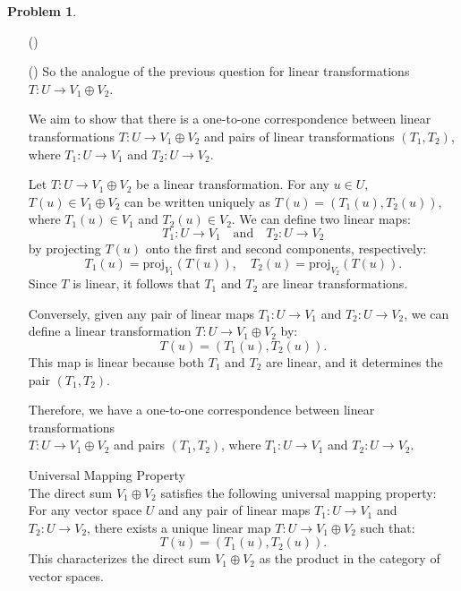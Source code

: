 \documentclass[12pt]{article}
\theoremstyle{definition}
\newtheorem{problem}{Problem}
\newcounter{subq}[problem]
\newenvironment{subproblem}
{\refstepcounter{subq} \begin{itemize} \item[(\alph{subq})]}
{\end{itemize} \medskip}
\begin{document}
\begin{problem}
\begin{subproblem}
\begin{solution}
        \end{solution}
    \end{subproblem}

    \begin{subproblem}
        So the analogue of the previous question for linear transformations $T:U \rightarrow V_1 \oplus V_2$.

        \begin{solution}
            We aim to show that there is a one-to-one correspondence between linear transformations \( T: U \to V_1 \oplus V_2 \) and pairs of linear transformations \( (T_1, T_2) \), where \( T_1: U \to V_1 \) and \( T_2: U \to V_2 \).

            Let \( T: U \to V_1 \oplus V_2 \) be a linear transformation. For any \( u \in U \), \( T(u) \in V_1 \oplus V_2 \) can be written uniquely as \( T(u) = (T_1(u), T_2(u)) \), where \( T_1(u) \in V_1 \) and \( T_2(u) \in V_2 \). We can define two linear maps:
            \[
            T_1: U \to V_1 \quad \text{and} \quad T_2: U \to V_2
            \]
            by projecting \( T(u) \) onto the first and second components, respectively:
            \[
            T_1(u) = \text{proj}_{V_1}(T(u)), \quad T_2(u) = \text{proj}_{V_2}(T(u)).
            \]
            Since \( T \) is linear, it follows that \( T_1 \) and \( T_2 \) are linear transformations.

            Conversely, given any pair of linear maps \( T_1: U \to V_1 \) and \( T_2: U \to V_2 \), we can define a linear transformation \( T: U \to V_1 \oplus V_2 \) by:
            \[
            T(u) = (T_1(u), T_2(u)).
            \]
            This map is linear because both \( T_1 \) and \( T_2 \) are linear, and it determines the pair \( (T_1, T_2) \).

            Therefore, we have a one-to-one correspondence between linear transformations \\
            \( T: U \to V_1 \oplus V_2 \) and pairs \( (T_1, T_2) \), where \( T_1: U \to V_1 \) and \( T_2: U \to V_2 \).

            Universal Mapping Property\\
            The direct sum \( V_1 \oplus V_2 \) satisfies the following universal mapping property: For any vector space \( U \) and any pair of linear maps \( T_1: U \to V_1 \) and \( T_2: U \to V_2 \), there exists a unique linear map \( T: U \to V_1 \oplus V_2 \) such that:
            \[
            T(u) = (T_1(u), T_2(u)).
            \]
            This characterizes the direct sum \( V_1 \oplus V_2 \) as the product in the category of vector spaces.
        \end{solution}
    \end{subproblem}
\end{problem}
\end{document}
